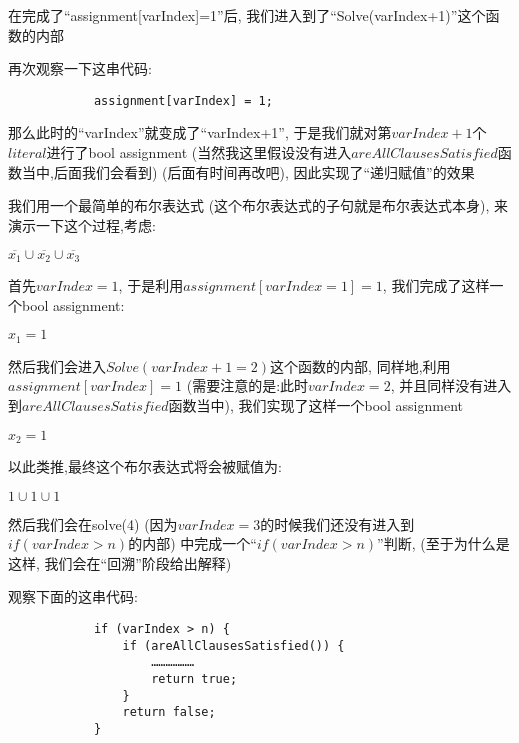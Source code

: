        在完成了``assignment[varIndex]=1''后,
        我们进入到了``Solve(varIndex+1)''这个函数的内部
        \par
        再次观察一下这串代码:
        \begin{lstlisting}
            assignment[varIndex] = 1;
        \end{lstlisting}
        \par
        那么此时的``varIndex''就变成了``varIndex+1'',
        于是我们就对第$varIndex+1$个$literal$进行了bool assignment
        (当然我这里假设没有进入$areAllClausesSatisfied$函数当中,后面我们会看到)
        (后面有时间再改吧),
        因此实现了``递归赋值''的效果\par
        我们用一个最简单的布尔表达式
        (这个布尔表达式的子句就是布尔表达式本身),
        来演示一下这个过程,考虑:
        \begin{center}
            $\overline{x_{1}} \cup \overline{x_{2}} \cup \overline{x_{3}}$
        \end{center}
        \par
        首先$varIndex=1$,
        于是利用$assignment[varIndex=1]=1$,
        我们完成了这样一个bool assignment:
        \begin{center}
            $x_{1}=1$
        \end{center}
        \par
        然后我们会进入$Solve(varIndex+1=2)$这个函数的内部,
        同样地,利用$assignment[varIndex]=1$
        (需要注意的是:此时$varIndex=2$,
        并且同样没有进入到$areAllClausesSatisfied$函数当中),
        我们实现了这样一个bool assignment
        \begin{center}
            $x_{2}=1$
        \end{center}
        \par
        以此类推,最终这个布尔表达式将会被赋值为:
        \begin{center}
            $1 \cup 1 \cup 1$
        \end{center}
        \par
        然后我们会在solve(4)
        (因为$varIndex=3$的时候我们还没有进入到$if(varIndex > n)$的内部)
        中完成一个``$if(varIndex > n)$''判断,
        (至于为什么是这样,
        我们会在``回溯''阶段给出解释)
        \par
        观察下面的这串代码:
        \begin{lstlisting}
            if (varIndex > n) {
                if (areAllClausesSatisfied()) {
                    ………………
                    return true;
                }
                return false;
            }
        \end{lstlisting}
